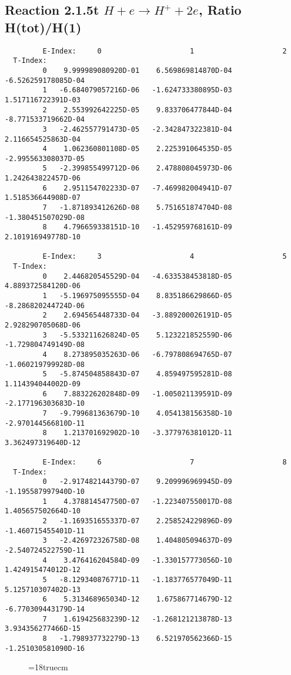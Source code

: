 \newpage
\subsection{
Reaction 2.1.5t $ H + e \rightarrow H^+ + 2e$, Ratio H(tot)/H(1)
}



\begin{verbatim}
         E-Index:     0                     1                     2
  T-Index:
         0    9.999989080920D-01    6.569869814870D-04   -6.526259178085D-04
         1   -6.684079057216D-06   -1.624733380895D-03    1.517116722391D-03
         2    2.553992642225D-05    9.833706477844D-04   -8.771533719662D-04
         3   -2.462557791473D-05   -2.342847322381D-04    2.116654525863D-04
         4    1.062360801108D-05    2.225391064535D-05   -2.995563308037D-05
         5   -2.399855499712D-06    2.478808045973D-06    1.242643822457D-06
         6    2.951154702233D-07   -7.469982004941D-07    1.518536644908D-07
         7   -1.871893412626D-08    5.751651874704D-08   -1.380451507029D-08
         8    4.796659338151D-10   -1.452959768161D-09    2.101916949778D-10

         E-Index:     3                     4                     5
  T-Index:
         0    2.446820545529D-04   -4.633538453818D-05    4.889372584120D-06
         1   -5.196975095555D-04    8.835186629866D-05   -8.286820244724D-06
         2    2.694565448733D-04   -3.889200026191D-05    2.928290705068D-06
         3   -5.533211626824D-05    5.123221852559D-06   -1.729804749149D-08
         4    8.273895035263D-06   -6.797808694765D-07   -1.060219799928D-08
         5   -5.874504858843D-07    4.859497595281D-08    1.114394044002D-09
         6    7.883226202848D-09   -1.005021139591D-09   -2.177196303683D-10
         7   -9.799681363679D-10    4.054138156358D-10   -2.970144566810D-11
         8    1.213701692902D-10   -3.377976381012D-11    3.362497319640D-12

         E-Index:     6                     7                     8
  T-Index:
         0   -2.917482144379D-07    9.209996969945D-09   -1.195587997940D-10
         1    4.378814547750D-07   -1.223407550017D-08    1.405657502664D-10
         2   -1.169351655337D-07    2.258524229896D-09   -1.460715455401D-11
         3   -2.426972326758D-08    1.404805094637D-09   -2.540724522759D-11
         4    3.476416204584D-09   -1.330157773056D-10    1.424915474012D-12
         5   -8.129340876771D-11   -1.183776577049D-11    5.125710307402D-13
         6    5.313468965034D-12    1.675867714679D-12   -6.770309443179D-14
         7    1.619425683239D-12   -1.268121213878D-13    3.934356277466D-15
         8   -1.798937732279D-13    6.521970562366D-15   -1.251030581090D-16

\end{verbatim}
\begin{figure} \label{2.1.5t}
\epsfxsize=18truecm
\end{figure}

